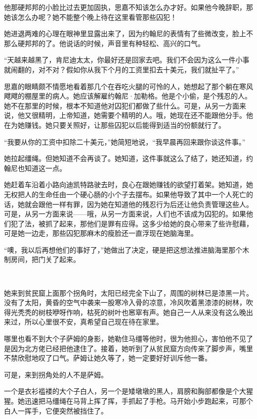 \par 他那硬邦邦的小脸比过去更加固执，思嘉不知该怎么办才好。如果他今晚辞职，那她该怎么办呢？她不能整个晚上待在这里看管那些囚犯！
\par 她进退两难的心理在眼神里显露出来了，因为约翰尼的表情有了些微改变，脸上不那么硬邦邦的了。他说话的时候，声音里有种轻松、高兴的口气。
\par “天越来越黑了，肯尼迪太太，你最好还是回家去吧。我们不会因为这么一件小事就闹翻的，对不对？假如你从我下个月的工资里扣去十美元，我们就扯平了。”
\par 思嘉的眼睛颇不情愿地看着那几个在吞吃火腿的可怜的人，她想起了那个躺在寒风飕飕的棚屋里的病人。她应该解雇约翰尼·加勒格。他是个小偷，是个残忍的人。她不在那里的时候，根本不知道他对囚犯们都做了些什么。可是，从另一方面来说，他又很精明，上帝知道，她需要个精明的人。哦，她现在还不能跟他分手。他在为她赚钱。她只要关照好，让那些囚犯以后能得到适当的份额就行了。
\par “我要从你的工资中扣除二十美元，”她简短地说，“我早晨再回来跟你谈这件事。”
\par 她拉起缰绳。但她知道不会再谈了。她知道，这件事就这么了结了，她还知道，约翰尼也知道这一点。
\par 她赶着车沿着小路向迪凯特路驶去时，良心在跟她赚钱的欲望打着架。她知道，她无权把人的生命任由一个硬心肠的小个子去摆布。如果他导致了其中一个人死亡的话，她就会跟他一样有罪，因为她在知道他的残忍行为后还让他负责管理这些人。可是，从另一方面来说——哦，从另一方面来说，人们也不该成为囚犯的。如果他们犯了法，被抓了起来，那他们是罪有应得。这多少给她的良心带来了些许慰藉，可是她一边走，那些囚犯那麻木的瘦脸还一直浮现在她脑海里。
\par “噢，我以后再想他们的事好了，”她做出了决定，硬是把这想法推进脑海里那个木制房间，把门关了起来。
\par  
\par 她来到贫民窟上面那个拐角时，太阳已经完全下山了，周围的树林已是漆黑一片。没有了太阳，黄昏的空气中袭来一股寒冷入骨的凉意，冷风吹着黑漆漆的树林，吹得光秃秃的树枝咿呀作响，枯死的树叶也窸窣有声。她自己一人从来没有这么晚出来过，所以心里很不安，真希望自己现在待在家里。
\par 哪里也看不到大个子萨姆的身影，她勒住马缰等他时，很为他担心，害怕他不见了是因为北方佬已经把他逮住了。接着，她听到了从贫民窟方向传来了脚步声，嘴里不禁欣慰地叹了口气。萨姆让她久等了，她一定要好好训斥他一番。
\par 可是，来到拐角处的人不是萨姆。
\par 一个是衣衫褴褛的大个子白人，另一个是矮墩墩的黑人，肩膀和胸部都像是个大猩猩。她迅速把马缰绳在马背上挥了挥，手抓起了手枪。马开始小步跑起来，可那个白人一挥手，它便突然被挡住了。
